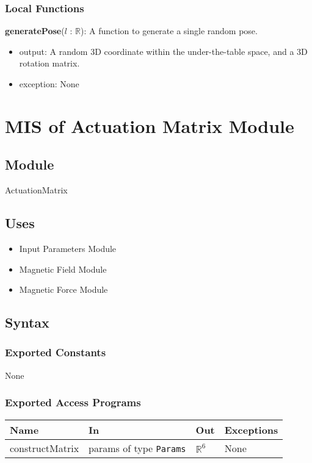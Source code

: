 \documentclass[12pt, titlepage]{article}
\begin{document}
\subsubsection{Local Functions}
\textbf{generatePose}($l$ : $\mathbb{R}$): A function to generate a single random pose.
\begin{itemize}
  \item output: A random 3D coordinate within the under-the-table space, and a 3D rotation matrix.
  \item exception: None
\end{itemize}

\newpage

\section{MIS of Actuation Matrix Module} \label{MISActMatrix}

\subsection{Module}
ActuationMatrix

\subsection{Uses}
\begin{itemize}
  \item Input Parameters Module
  \item Magnetic Field Module
  \item Magnetic Force Module 
\end{itemize}

\subsection{Syntax}

\subsubsection{Exported Constants}
None

\subsubsection{Exported Access Programs}
\begin{center}
\begin{tabular}{p{3cm} p{4cm} p{4cm} p{3cm}}
\hline
\textbf{Name} & \textbf{In} & \textbf{Out} & \textbf{Exceptions} \\
\hline
constructMatrix & params of type \texttt{Params} & $\mathbb{R}^6$ & None \\
\hline
\end{tabular}
\end{center}
\end{document}
